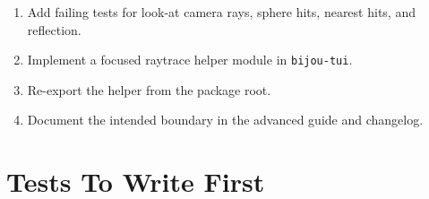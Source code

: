 \begin{enumerate}
\def\labelenumi{\arabic{enumi}.}
\tightlist
\item
  Add failing tests for look-at camera rays, sphere hits, nearest hits, and reflection.
\item
  Implement a focused raytrace helper module in \texttt{b\allowbreak{}i\allowbreak{}j\allowbreak{}o\allowbreak{}u\allowbreak{}-\allowbreak{}t\allowbreak{}u\allowbreak{}i}.
\item
  Re-export the helper from the package root.
\item
  Document the intended boundary in the advanced guide and changelog.
\end{enumerate}

\section{Tests To Write First}\label{record-159-tests-to-write-first}

